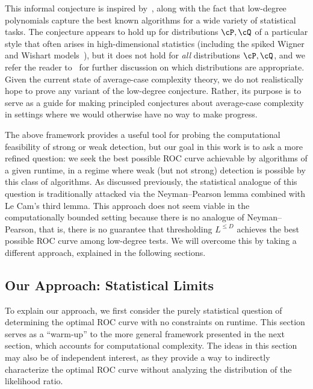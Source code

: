 \documentclass[11pt]{article}
\begin{document}
\noindent This informal conjecture is inspired by~\cite[Hypothesis~2.1.5 \& Conjecture~2.2.4]{hopkins-thesis}, along with the fact that low-degree polynomials capture the best known algorithms for a wide variety of statistical tasks. The conjecture appears to hold up for distributions $\cP,\cQ$ of a particular style that often arises in high-dimensional statistics (including the spiked Wigner and Wishart models~\cite{sk-cert,ld-notes,subexp-sparse,spectral-planting}), but it does not hold for \emph{all} distributions $\cP,\cQ$, and we refer the reader to~\cite{hopkins-thesis,ld-notes,HW-counter,morris,KM-tree,lattice-1,lattice-2} for further discussion on which distributions are appropriate. Given the current state of average-case complexity theory, we do not realistically hope to prove any variant of the low-degree conjecture. Rather, its purpose is to serve as a guide for making principled conjectures about average-case complexity in settings where we would otherwise have no way to make progress.

The above framework provides a useful tool for probing the computational feasibility of strong or weak detection, but our goal in this work is to ask a more refined question: we seek the best possible ROC curve achievable by algorithms of a given runtime, in a regime where weak (but not strong) detection is possible by this class of algorithms. As discussed previously, the statistical analogue of this question is traditionally attacked via the Neyman--Pearson lemma combined with Le Cam's third lemma. This approach does not seem viable in the computationally bounded setting because there is no analogue of Neyman--Pearson, that is, there is no guarantee that thresholding $L^{\le D}$ achieves the best possible ROC curve among low-degree tests. We will overcome this by taking a different approach, explained in the following sections.




\subsection{Our Approach: Statistical Limits}
\label{sec:our-approach-stat}

To explain our approach, we first consider the purely statistical question of determining the optimal ROC curve with no constraints on runtime. This section serves as a ``warm-up'' to the more general framework presented in the next section, which accounts for computational complexity. The ideas in this section may also be of independent interest, as they provide a way to indirectly characterize the optimal ROC curve without analyzing the distribution of the likelihood ratio.
\end{document}
